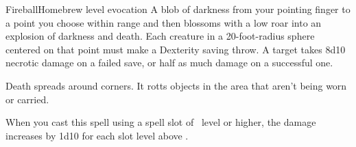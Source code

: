 \begin{spell}{Fireball}{Homebrew}{ level evocation}
{
}
A blob of darkness from your pointing finger to a point you
choose within range and then blossoms with a low roar into
an explosion of darkness and death. Each creature
in a 20-foot-radius sphere centered on that point must
make a Dexterity saving throw. A target takes 8d10
necrotic damage on a failed save, or half as much damage on a
successful one.

Death spreads around corners. It rotts objects in the area that
aren’t being worn or carried.

 When you cast this spell using a
spell slot of ~level or higher, the damage increases by
1d10 for each slot level above .
\end{spell}